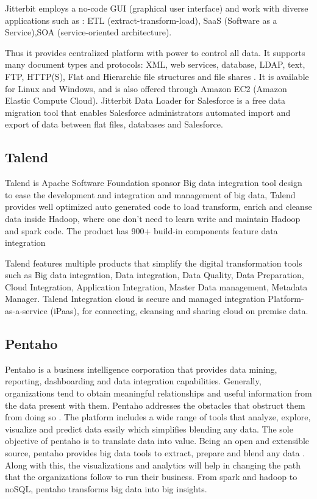     Jitterbit employs a no-code GUI (graphical user interface) and
    work with diverse applications such as : ETL
    (extract-transform-load), SaaS (Software as a Service),SOA
    (service-oriented architecture).

    Thus it provides centralized platform with power to control all
    data. It supports many document types and protocols: XML, web
    services, database, LDAP, text, FTP, HTTP(S), Flat and Hierarchic
    file structures and file shares \cite{tech-manual}. It is
    available for Linux and Windows, and is also offered through
    Amazon EC2 (Amazon Elastic Compute Cloud). Jitterbit Data Loader
    for Salesforce is a free data migration tool that enables
    Salesforce administrators automated import and export of data
    between flat files, databases and Salesforce.

\subsection{Talend}

    Talend is Apache Software Foundation sponsor Big data integration
    tool design to ease the development and integration and management
    of big data, Talend provides well optimized auto generated code to
    load transform, enrich and cleanse data inside Hadoop, where one
    don’t need to learn write and maintain Hadoop and spark code.  The
    product has 900+ build-in components feature data integration
     
    Talend features multiple products that simplify the digital
    transformation tools such as Big data integration, Data
    integration, Data Quality, Data Preparation, Cloud Integration,
    Application Integration, Master Data management, Metadata Manager.
    Talend Integration cloud is secure and managed integration
    Platform-as-a-service (iPaas), for connecting, cleansing and
    sharing cloud on premise data.

\subsection{Pentaho}

    Pentaho is a business intelligence corporation that provides data
    mining, reporting, dashboarding and data integration
    capabilities. Generally, organizations tend to obtain meaningful
    relationships and useful information from the data present with
    them. Pentaho addresses the obstacles that obstruct them from
    doing so \cite{pent1}. The platform includes a wide range of
    tools that analyze, explore, visualize and predict data easily
    which simplifies blending any data. The sole objective of pentaho
    is to translate data into value. Being an open and extensible
    source, pentaho provides big data tools to extract, prepare and
    blend any data \cite{pent2}. Along with this, the visualizations
    and analytics will help in changing the path that the
    organizations follow to run their business. From spark and hadoop
    to noSQL, pentaho transforms big data into big insights.

